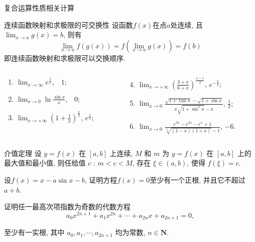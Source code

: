 \documentclass[
10pt,
aspectratio=43,
]{beamer}
\begin{document}
\begin{frame}{复合运算性质相关计算}
	\begin{block}{连续函数映射和求极限的可交换性}
		设函数$f(x)$在点$a$处连续, 且$\lim_{x\to a}g(x)=b$, 则有
		\[\lim_{x\to a}f(g(x))=f(\lim_{x\to a}g(x))=f(b)\]
		即连续函数映射和求极限可以交换顺序.
	\end{block}
	\pause
	\begin{block}{}
		\begin{columns}[onlytextwidth]
			\begin{column}{0.3\textwidth}
				\begin{enumerate}
					\item $\displaystyle \lim _{x \rightarrow \infty} e^{\frac{1}{x}}$, \pause\,\, $1$;\pause
					\item $\displaystyle \lim _{x \rightarrow 0} \ln \frac{\sin x}{x}$, \pause\,\, $0$;\pause
					\item $\displaystyle \lim _{x \rightarrow +\infty}\left(1+\frac{1}{x}\right)^{\frac{x}{2}}$,\pause  \,\,$e^\frac{1}{2}$;\pause
				\end{enumerate}
			\end{column}
			\begin{column}{0.55\textwidth}
				\begin{enumerate}
					\setcounter{enumi}{3}
					\item $\displaystyle \lim _{x \rightarrow +\infty}\left(\frac{3+x}{6+x}\right)^{\frac{x-1}{2}}$,\,\,\pause $e^{-\frac{3}{2}}$;\pause
					\item $\displaystyle \lim _{x \rightarrow 0} \frac{\sqrt{1+\tan x}-\sqrt{1+\sin x}}{x \sqrt{1+\sin ^2 x}-x}$,\,\,\pause $\displaystyle\frac{1}{2}$;\pause
					\item $\displaystyle \lim _{x \rightarrow 0} \frac{e^{3 x}-e^{2 x}-e^x+1}{\sqrt[3]{(1-x)(1+x)}-1}$,\,\,\pause $-6$.
				\end{enumerate}
			\end{column}
		\end{columns}
	\end{block}
\end{frame}

\begin{frame}
	\begin{block}{介值定理}
		设 $y=f(x)$ 在 $[a, b]$ 上连续, $M$ 和 $m$ 为 $y=f(x)$ 在 $[a, b]$ 上的最大值和最小值, 则任给值 $c$ : $m<c<M$, 存在 $\xi \in(a, b)$, 使得 $f(\xi)=c$.
	\end{block}
	\pause
	\begin{block}{}
		设$f(x)=x-a \sin x-b$, 证明方程$f(x)=0$至少有一个正根, 并且它不超过$a+b$.
	\end{block}
	\pause
	\begin{block}{}
		证明任一最高次项指数为奇数的代数方程
		$$
			a_0 x^{2 n+1}+a_1 x^{2 n}+\cdots+a_{2 n} x+a_{2 n+1}=0,
		$$

		至少有一实根, 其中 $a_0, a_1, \cdots, a_{2 n+1}$ 均为常数, $n \in \mathbf{N}$.
	\end{block}
\end{frame}
\end{document}
